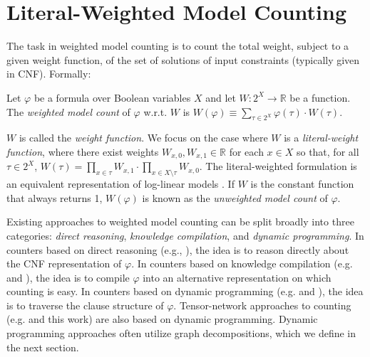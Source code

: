 \section{Literal-Weighted Model Counting}
\label{sec:wmc}

The task in weighted model counting is to count the total weight, subject to a given weight function, of the set of solutions of input constraints (typically given in CNF). Formally:
\begin{definition}
  Let $\varphi$ be a formula over Boolean variables $X$ and let $W: 2^X \rightarrow \mathbb{R}$ be a function. The \emph{weighted model count} of $\varphi$ w.r.t. $W$ is
  $W(\varphi) \equiv \sum_{\tau \in 2^X} \varphi(\tau) \cdot W(\tau).$
\end{definition}
$W$ is called the \emph{weight function}. We focus on the case where $W$ is a \emph{literal-weight function}, where there exist weights $W_{x,0}, W_{x,1} \in \mathbb{R}$ for each $x \in X$ so that, for all $\tau \in 2^X$, $W(\tau) = \prod_{x \in \tau} W_{x,1} \cdot \prod_{x \in X \setminus \tau} W_{x,0}$. The literal-weighted formulation is an equivalent representation of log-linear models \cite{koller2009probabilistic}. If $W$ is the constant function that always returns 1, $W(\varphi)$ is known as the \emph{unweighted model count} of $\varphi$.


Existing approaches to weighted model counting can be split broadly into three categories: \emph{direct reasoning}, \emph{knowledge compilation}, and \emph{dynamic programming}. In counters based on direct reasoning (e.g.,  \cite{SBK05}), the idea is to reason directly about the CNF representation of $\varphi$. In counters based on knowledge compilation (e.g.  \cite{OD15} and  \cite{LM17}), the idea is to compile $\varphi$ into an alternative representation on which counting is easy. In counters based on dynamic programming (e.g.  \cite{DPV20} and  \cite{FHWZ18,FHZ19}), the idea is to traverse the clause structure of $\varphi$. Tensor-network approaches to counting (e.g.  \cite{DDV19} and this work) are also based on dynamic programming. Dynamic programming approaches often utilize graph decompositions, which we define in the next section. 
